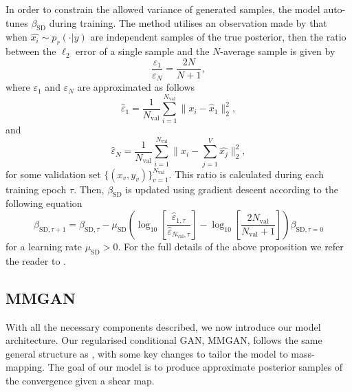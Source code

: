 \documentclass[fleqn,usenatbib]{mnras}
\begin{document}
In order to constrain the allowed variance of generated samples, the model auto-tunes $\beta_{\text{SD}}$ during training. The method utilises an observation made by \citet[\S Prop. 3.3]{bendel2024regularized} that when $\hat{x_i} \sim p_r(\cdot | y)$ are independent samples of the true posterior, then the ratio between the $\ell_2$ error of a single sample and the $N$-average sample is given by
\begin{equation} 
	\dfrac{\varepsilon_1}{\varepsilon_N} = \dfrac{2N}{N+1},
\end{equation}
where $\varepsilon_1$ and $\varepsilon_N$ are approximated as follows
\begin{equation}
	\hat{\varepsilon}_1 = \dfrac{1}{N_\text{val}} \sum_{i=1}^{N_\text{val}} \lVert x_i - \hat{x}_1\rVert^2_2,
\end{equation}
and
\begin{equation}
	\hat{\varepsilon}_N = \dfrac{1}{N_\text{val}} \sum_{i=1}^{N_\text{val}} \lVert x_i - \sum_{j=1}^{V}\hat{x_j}\rVert^2_2,
\end{equation}
for some validation set $\{(x_v, y_v)\}^{N_\text{val}}_{v=1}$. This ratio is calculated during each training epoch $\tau$. Then, $\beta_{\text{SD}}$ is updated using gradient descent according to the following equation
\begin{equation}
	\beta_{\text{SD}, \tau+1} = \beta_{\text{SD}, \tau}  - \mu_{\text{SD}} \left( \log_{10} \left[ \dfrac{\hat{\varepsilon}_{1,\tau}}{\hat{\varepsilon}_{N_\text{val}, \tau}} \right] - \log_{10}\left[ \dfrac{2N_\text{val}}{N_\text{val}+1}\right]\right)\beta_{\text{SD}, \tau=0}
	\label{eq:beta_SD_update}
\end{equation}
for a learning rate $\mu_{\text{SD}} > 0$. For the full details of the above proposition we refer the reader to \citet{bendel2024regularized}.

\subsection{MMGAN}\label{subsec:model_architecture}

With all the necessary components described, we now introduce our model architecture. Our regularised conditional GAN, MMGAN, follows the same general structure as \citet{bendel2024regularized}, with some key changes to tailor the model to mass-mapping. The goal of our model is to produce approximate posterior samples of the convergence given a shear map. 
\end{document}
